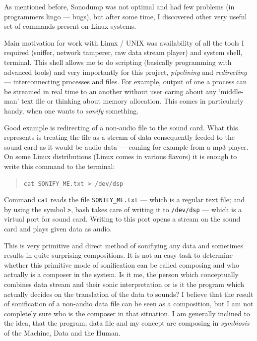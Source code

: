 \documentclass[12pt,a4paper,oneside]{report}
\begin{document}
As mentioned before, Sonodump was not optimal and had few problems (in programmers lingo --- bugs), but after some time, I discovered other very useful set of commands present on Linux systems.

Main motivation for work with Linux / UNIX was availability of all the tools I required (sniffer, network tamperer, raw data stream player) and system shell, terminal. This shell allows me to do scripting (basically programming with advanced tools) and very importantly for this project, \emph{pipelining} and \emph{redirecting} --- interconnecting processes and files. For example, output of one a process can be streamed in real time to an another without user caring about any `middle-man' text file or thinking about memory allocation. This comes in particularly handy, when one wants to \emph{sonify} something. 

Good example is redirecting of a non-audio file to the sound card. What this represents is treating the file as a stream of data consequently feeded to the sound card as it would be audio data --- coming for example from a mp3 player. On some Linux distributions (Linux comes in various flavors) it is enough to write this command to the terminal:
\begin{quotation}
	\texttt{cat SONIFY\_ME.txt > /dev/dsp} 
\end{quotation}

Command \texttt{cat} reads the file \texttt{SONIFY\_ME.txt} --- which is a regular text file; and by using the symbol \texttt{>}, bash takes care of writing it to \texttt{/dev/dsp} --- which is a virtual port for sound card. Writing to this port opens a stream on the sound card and plays given data as audio.

This is very primitive and direct method of sonifiying any data and sometimes results in quite surprising compositions. It is not an easy task to determine whether this primitive mode of sonification can be called composing and who actually is a composer in the system. Is it me, the person which conceptually combines data stream and their sonic interpretation or is it the program which actually decides on the translation of the data to sounds? I believe that the result of sonification of a non-audio data file can be seen as a composition, but I am not completely sure who is the composer in that situation. I am generally inclined to the idea, that the program, data file and my concept are composing in \emph{symbiosis} of the Machine, Data and the Human.
\end{document}
